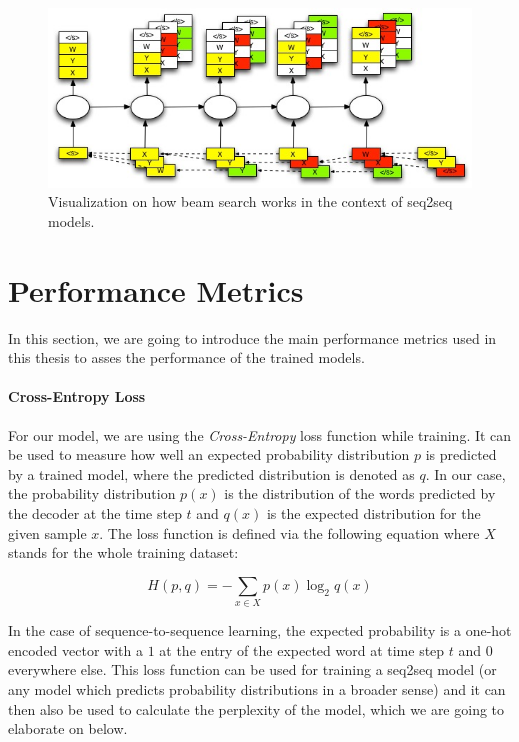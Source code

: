 \begin{figure}[H]
	\label{fundamentals:seq2seq:beam_search}
	\centering
	\includegraphics[width=12cm]{img/beam_search_visualization}
	\caption{Visualization on how beam search works in the context of seq2seq models.\protect\footnotemark}
\end{figure}

\section{Performance Metrics}
\label{fundamentals:metrics}
In this section, we are going to introduce the main performance metrics used in this thesis to asses the performance of the trained models.

\paragraph{Cross-Entropy Loss} For our model, we are using the \emph{Cross-Entropy} loss function while training. It can be used to measure how well an expected probability distribution $p$ is predicted by a trained model, where the predicted distribution is denoted as $q$. In our case, the probability distribution $p(x)$ is the distribution of the words predicted by the decoder at the time step $t$ and $q(x)$ is the expected distribution for the given sample $x$. The loss function is defined via the following equation where $X$ stands for the whole training dataset:

\begin{equation}
H(p, q) = -\sum_{x \in X} p(x) \log_2 q(x)
\end{equation}

In the case of sequence-to-sequence learning, the expected probability is a one-hot encoded vector with a $1$ at the entry of the expected word at time step $t$ and $0$ everywhere else. This loss function can be used for training a seq2seq model (or any model which predicts probability distributions in a broader sense) and it can then also be used to calculate the perplexity of the model, which we are going to elaborate on below.

